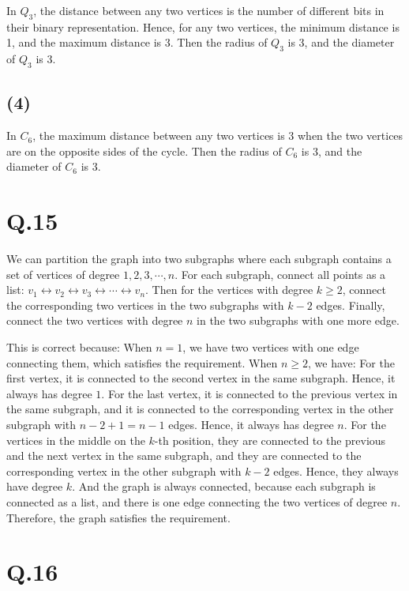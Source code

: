 \documentclass[a4paper,12pt]{article}
\begin{document}
In $Q_3$, the distance between any two vertices is the number of different bits in their binary representation.
Hence, for any two vertices, the minimum distance is 1, and the maximum distance is 3.
Then the radius of $Q_3$ is 3, and the diameter of $Q_3$ is 3.

\subsection*{(4)}

In $C_6$, the maximum distance between any two vertices is 3 when the two vertices are on the opposite sides of the cycle.
Then the radius of $C_6$ is 3, and the diameter of $C_6$ is 3.

\section*{Q.15}

We can partition the graph into two subgraphs where each subgraph contains a set of vertices of degree $1,2,3,\cdots, n$.
For each subgraph, connect all points as a list: $v_1 \leftrightarrow v_2 \leftrightarrow v_3 \leftrightarrow \cdots \leftrightarrow v_n$.
Then for the vertices with degree $k \geq 2$, connect the corresponding two vertices in the two subgraphs with $k-2$ edges.
Finally, connect the two vertices with degree $n$ in the two subgraphs with one more edge.

This is correct because:
When $n = 1$, we have two vertices with one edge connecting them, which satisfies the requirement.
When $n \geq 2$, we have:
For the first vertex, it is connected to the second vertex in the same subgraph.
Hence, it always has degree $1$.
For the last vertex, it is connected to the previous vertex in the same subgraph, and it is connected to the corresponding vertex in the other subgraph with $n - 2 + 1 = n - 1$ edges.
Hence, it always has degree $n$.
For the vertices in the middle on the $k$-th position, they are connected to the previous and the next vertex in the same subgraph, and they are connected to the corresponding vertex in the other subgraph with $k - 2$ edges.
Hence, they always have degree $k$.
And the graph is always connected, because each subgraph is connected as a list, and there is one edge connecting the two vertices of degree $n$.
Therefore, the graph satisfies the requirement.

\section*{Q.16}
\end{document}
